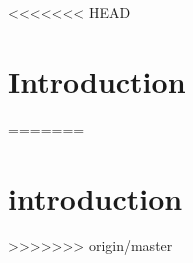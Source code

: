 <<<<<<< HEAD
\chapter{Introduction}
\label{sec:Introduction}
=======
\chapter{introduction}
\label{sec:introduction}
>>>>>>> origin/master

